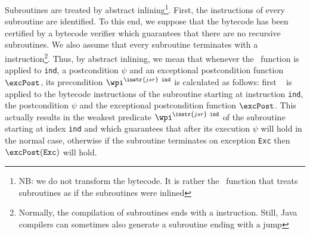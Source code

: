 Subroutines are treated by abstract inlining\footnote{NB: we do not transform the bytecode. It is rather the \wpi \
 function that treats subroutines as if the subroutines were inlined}. First, the instructions of every subroutine
 are identified. To this end, we suppose that the bytecode has
 been certified by a bytecode verifier which guarantees
that there are no recursive subroutines. We also assume that every subroutine terminates with a  
instruction\footnote{Normally, the compilation of subroutines ends with a \instr{ret} instruction. Still, Java 
compilers can sometimes also generate a subroutine ending with a jump}. Thus, by abstract inlining, we mean that
 whenever the \wpi~function is applied to \instr{jsr}  \texttt{ind}, a postcondition $\psi$ and an exceptional postcondition function 
$\excPost$, its precondition  $\wpi^{\instr{jsr} \ \tt{ind}}$ is calculated as follows:
first \wpi~ is applied to the bytecode instructions of the subroutine starting at instruction \texttt{ind},
 the postcondition $\psi$ and the exceptional postcondition function  $\excPost$. This actually results in the weakest predicate 
$\wpi^{\instr{jsr} \ \tt{ind}}$ of the subroutine starting at index \texttt{ind} and which guarantees that after its execution 
$\psi$ will hold in the normal case, otherwise if the subroutine terminates on exception \texttt{Exc} then $\excPost(\texttt{Exc})$ will hold.
  
 




